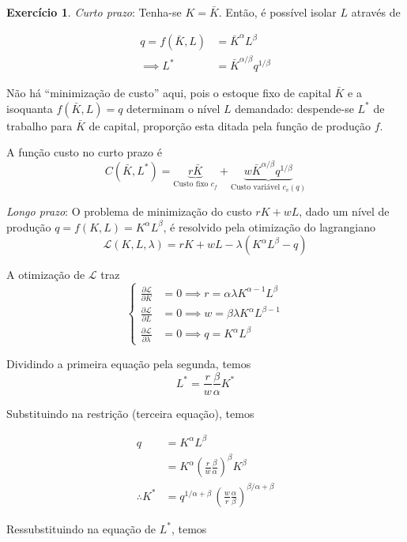 \documentclass[12pt]{article}
\numberwithin{equation}{section}
\theoremstyle{plain}
\theoremstyle{definition}
\newtheorem{exercise}{Exercício}
\theoremstyle{remark}
\begin{document}
\begin{exercise}
\textit{Curto prazo}: Tenha-se \(K = \bar{K}\). Então, é possível isolar
\(L\) através de

\begin{align*}
q = f(\bar{K},L) &= \bar{K}^{\alpha} L^{\beta} \\
\implies L^{*} &= \bar{K}^{\alpha/\beta} q^{1/\beta}
\end{align*}

Não há ``minimização de custo'' aqui, pois o estoque fixo de capital
\(\bar{K}\) e a isoquanta \(f(\bar{K},L) = q\) determinam o nível \(L\)
demandado: despende-se \(L^{*}\) de trabalho para \(\bar{K}\) de
capital, proporção esta ditada pela função de produção \(f\).

A função custo no curto prazo é
\[
C(\bar{K},L^{*}) = \underbrace{ r\bar{K} }_{ \text{Custo fixo } c_{f} } + \underbrace{ w \bar{K}^{\alpha/\beta} q^{1/\beta} }_{ \text{Custo variável } c_{v}(q) }
\]

\textit{Longo prazo}: O problema de minimização do custo \(rK + wL\),
dado um nível de produção \(q=f(K,L) = K^{\alpha}L^{\beta}\), é
resolvido pela otimização do lagrangiano
\[
\mathcal{L}(K, L, \lambda) = rK+wL - \lambda (K^{\alpha}L^{\beta} - q)
\]

A otimização de \(\mathcal{L}\) traz
\[
\begin{cases}
\frac{ \partial \mathcal{L} }{ \partial K } &= 0 \implies r = \alpha \lambda K^{\alpha-1} L^{\beta} \\
 \frac{ \partial \mathcal{L} }{ \partial L } &=0 \implies w = \beta \lambda K^{\alpha}L^{\beta-1} \\
 \frac{ \partial \mathcal{L} }{ \partial \lambda } &=0 \implies q = K^{\alpha}L^{\beta}
\end{cases}
\]

Dividindo a primeira equação pela segunda, temos
\[
L^{*} = \frac{r}{w} \frac{\beta}{\alpha} K^{*}
\]

Substituindo na restrição (terceira equação), temos

\begin{align*}
q &= K^{\alpha}L^{\beta} \\
&= K^{\alpha} \left( \frac{r}{w} \frac{\beta}{\alpha} \right)^{\beta} K^{\beta} \\
\therefore K^{*} &= q^{1/\alpha+\beta} \, \left( \frac{w}{r} \frac{\alpha}{\beta} \right)^{\beta/\alpha+\beta}
\end{align*}

Ressubstituindo na equação de \(L^{*}\), temos


\end{exercise}
\end{document}
